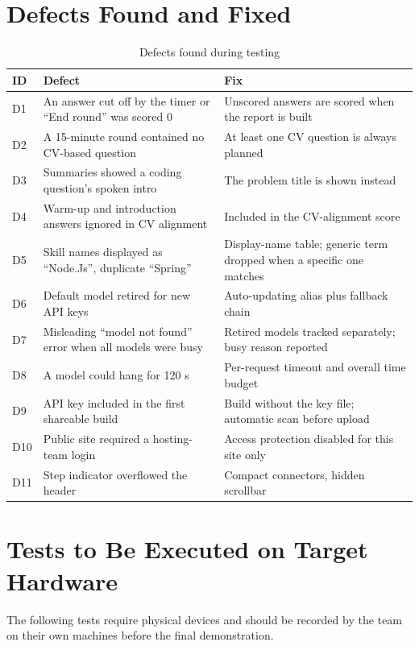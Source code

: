\documentclass[12pt,a4paper,oneside]{report}
\begin{document}
\section{Defects Found and Fixed}
\begin{table}[H]
\centering
\caption{Defects found during testing}
\label{tab:defects}
\footnotesize
\begin{tabularx}{\textwidth}{@{}lYY@{}}
\toprule
\textbf{ID} & \textbf{Defect} & \textbf{Fix} \\
\midrule
D1 & An answer cut off by the timer or ``End round'' was scored 0 & Unscored answers are scored when the report is built \\
D2 & A 15-minute round contained no CV-based question & At least one CV question is always planned \\
D3 & Summaries showed a coding question's spoken intro & The problem title is shown instead \\
D4 & Warm-up and introduction answers ignored in CV alignment & Included in the CV-alignment score \\
D5 & Skill names displayed as ``Node.Js'', duplicate ``Spring'' & Display-name table; generic term dropped when a specific one matches \\
D6 & Default model retired for new API keys & Auto-updating alias plus fallback chain \\
D7 & Misleading ``model not found'' error when all models were busy & Retired models tracked separately; busy reason reported \\
D8 & A model could hang for 120 s & Per-request timeout and overall time budget \\
D9 & API key included in the first shareable build & Build without the key file; automatic scan before upload \\
D10 & Public site required a hosting-team login & Access protection disabled for this site only \\
D11 & Step indicator overflowed the header & Compact connectors, hidden scrollbar \\
\bottomrule
\end{tabularx}
\end{table}

\section{Tests to Be Executed on Target Hardware}
The following tests require physical devices and should be recorded by the team on their own machines before the final demonstration.
\end{document}
